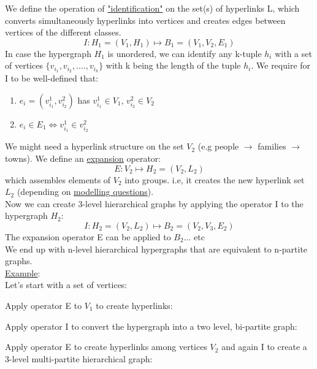 \documentclass[11pt]{book}
\begin{document}
We define the operation of \underline{"identification"} on the set(s) of hyperlinks L, which converts simultaneously hyperlinks into vertices and creates edges between vertices of the different classes. $$I: H_{1}=(V_{1},H_{1}) \mapsto B_{1}=(V_{1},V_{2},E_{1}) $$
In case the hypergraph $H_{1}$ is unordered, we can identify any k-tuple $h_{i}$ with a set of vertices $\{v_{i_{1}},v_{i_{2}},....,v_{i_{k}}\}$ with k being the length of the tuple $h_{i}$. We require for I to be well-defined that:
\begin{enumerate}
\item $e_{i} = (v_{i_{1}}^{1},v_{i_{2}}^{2})$ has $v_{i_{1}}^{1} \in V_{1}$, $v_{i_{2}}^{2} \in V_{2}$
\item $e_{i} \in E_{1} \Leftrightarrow v_{i_{1}}^{1}\in v_{i_{2}}^{2}$
\end{enumerate}

\vspace{5cm}

We might need a hyperlink structure on the set $V_{2}$ (e.g people $\rightarrow$ families $\rightarrow$ towns). We define an \underline{expansion} operator: $$E:V_{2} \mapsto H_{2} = (V_{2},L_{2})$$
which assembles elements of $V_{2}$ into groups. i.e, it creates the new hyperlink set $L_{2}$ (depending on \underline{modelling questions}).\\

Now we can create 3-level hierarchical graphs by applying the operator I to the hypergraph $H_{2}$: $$I: H_{2} = (V_{2},L_{2}) \mapsto B_{2} = (V_{2},V_{3},E_{2})$$
The expansion operator E can be applied to $B_{2}$... etc\\

We end up with n-level hierarchical hypergraphs that are equivalent to n-partite graphs.\\
\underline{Example}:\\

Let's start with a set of vertices:

\vspace{5cm}

Apply operator E to $V_{1}$ to create hyperlinks:

\vspace{5cm}

Apply operator I to convert the hypergraph into a two level, bi-partite graph:

\vspace{5cm}

Apply operator E to create hyperlinks among vertices $V_{2}$ and again I to create a 3-level multi-partite hierarchical graph:
\end{document}
